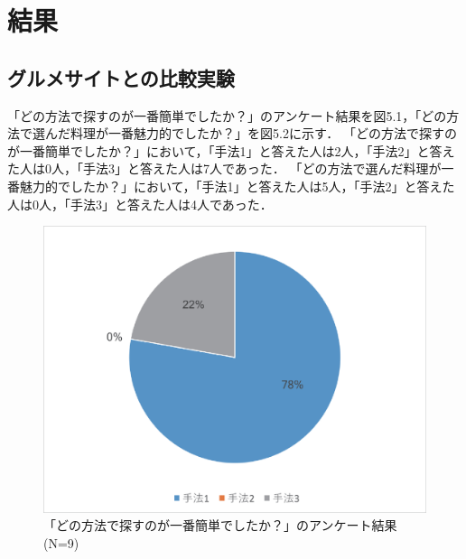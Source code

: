 \documentclass{funthesis}
\begin{document}
\section{結果}
\subsection{グルメサイトとの比較実験}
「どの方法で探すのが一番簡単でしたか？」のアンケート結果を図5.1，「どの方法で選んだ料理が一番魅力的でしたか？」を図5.2に示す．
「どの方法で探すのが一番簡単でしたか？」において，「手法1」と答えた人は2人，「手法2」と答えた人は0人，「手法3」と答えた人は7人であった．
「どの方法で選んだ料理が一番魅力的でしたか？」において，「手法1」と答えた人は5人，「手法2」と答えた人は0人，「手法3」と答えた人は4人であった．

\begin{figure}[tbp]
  \begin{center}
    \includegraphics[clip,width=12cm]{5.1.eps}
    \caption[「どの方法で探すのが一番簡単でしたか？」のアンケート結果]{「どの方法で探すのが一番簡単でしたか？」のアンケート結果(N=9)}
  \end{center}
\end{figure}
\end{document}
